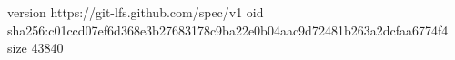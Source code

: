 version https://git-lfs.github.com/spec/v1
oid sha256:c01ccd07ef6d368e3b27683178c9ba22e0b04aac9d72481b263a2dcfaa6774f4
size 43840
